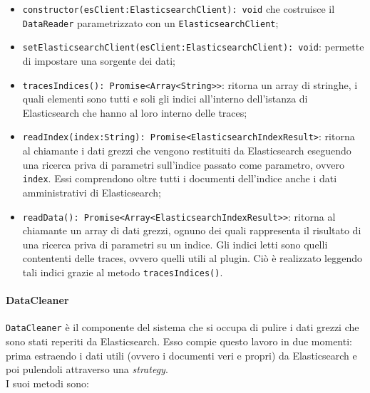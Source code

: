 \begin{itemize} 
	\item \texttt{constructor(esClient:ElasticsearchClient): void} che costruisce il \texttt{DataReader} parametrizzato con un \texttt{ElasticsearchClient};
	\item \texttt{setElasticsearchClient(esClient:ElasticsearchClient): void}: permette di impostare una sorgente dei dati;
	\item \texttt{tracesIndices(): Promise<Array<String>>}: ritorna un array di stringhe, i quali elementi sono tutti e soli gli indici all'interno dell'istanza di Elasticsearch che hanno al loro interno delle traces;
	\item \texttt{readIndex(index:String): Promise<ElasticsearchIndexResult>}: ritorna al chiamante i dati grezzi che vengono restituiti da Elasticsearch eseguendo una ricerca priva di parametri sull'indice passato come parametro, ovvero \texttt{index}. Essi comprendono oltre tutti i documenti dell'indice anche i dati amministrativi di Elasticsearch;
	\item \texttt{readData(): Promise<Array<ElasticsearchIndexResult>>}: ritorna al chiamante un array di dati grezzi, ognuno dei quali rappresenta il risultato di una ricerca priva di parametri su un indice. Gli indici letti sono quelli contententi delle traces, ovvero quelli utili al plugin. Ciò è realizzato leggendo tali indici grazie al metodo \texttt{tracesIndices()}.
\end{itemize}

\paragraph{DataCleaner}\Spazio
\label{sec:DataCleaner}
\texttt{DataCleaner} è il componente del sistema che si occupa di pulire i dati grezzi che sono stati reperiti da Elasticsearch. Esso compie questo lavoro in due momenti: prima estraendo i dati utili (ovvero i documenti veri e propri) da Elasticsearch e poi pulendoli attraverso una \emph{strategy}.\\
I suoi metodi sono:

